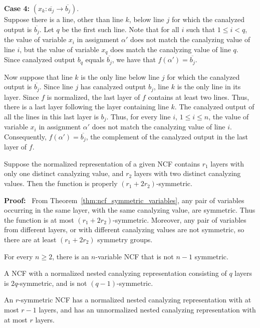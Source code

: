 \noindent
{\bf Case 4:} $(x_k : \overline{a_j} \rightarrow \overline{b_j})$.  \\ 
Suppose there is a line, other than line $k$, below line $j$ for
which the canalyzed output is $\overline{b_j}$.  Let $q$ be the
first such line.  Note that for all $i$ such that $1 \leq i < q$,
the value of variable $x_i$ in assignment $\alpha'$ does not match
the canalyzing value of line $i$, but the value of variable $x_q$
does match the canalyzing value of line $q$.  Since canalyzed output
$b_q$ equals $\overline{b_j}$, we have that $f(\alpha') =
\overline{b_j}$.

Now suppose that line $k$ is the only line below line $j$ for which
the canalyzed output is $\overline{b_j}$.  Since line $j$ has
canalyzed output $b_j$, line $k$ is the only line in its layer.
Since $f$ is normalized, the last layer of $f$ contains at least
two lines.  Thus, there is a last layer following the layer containing
line $k$.  The canalyzed output of all the lines in this last layer
is $b_j$.  Thus, for every line $i$, $1 \leq i \leq n$, the value
of variable $x_i$ in assignment $\alpha'$ does not match the
canalyzing value of line $i$.  Consequently, $f(\alpha') =
\overline{b_j}$, the complement of the canalyzed output in the last
layer of $f$.  \QED

\begin{theorem}\label{thm:ncf_r_symmetric}
Suppose the normalized representation of a given NCF contains 
$r_1$ layers with only one distinct canalyzing value,
and $r_2$ layers with two distinct canalyzing values.
Then the function is properly $(r_1 + 2 r_2)$-symmetric.
\end{theorem}
\noindent
\textbf{Proof:}~
From Theorem~\ref{thm:ncf_symmetric_variables}, 
any pair of variables occurring in the same layer, with the same canalyzing value,
are symmetric.
Thus the function is at most $(r_1 + 2 r_2)$-symmetric.
Moreover, any pair of variables from different layers, or with different canalyzing values
are not symmetric, so there are at least $(r_1 + 2 r_2)$ symmetry groups.
\QED

\begin{corollary}\label{cor:ncf_not_rsymm}
For every $n \geq 2$, there is an $n$-variable NCF that is not $n-1$ symmetric.
\end{corollary}

\begin{corollary}\label{cor:ncf_r_symmetric_layers}
A NCF with a normalized nested canalyzing representation consisting
of $q$ layers is $2q$-symmetric, and is not $(q-1)$-symmetric.

An $r$-symmetric NCF has a normalized nested canalyzing representation
with at most $r-1$ layers, and has an unnormalized nested canalyzing
representation with at most $r$ layers.  \end{corollary}

